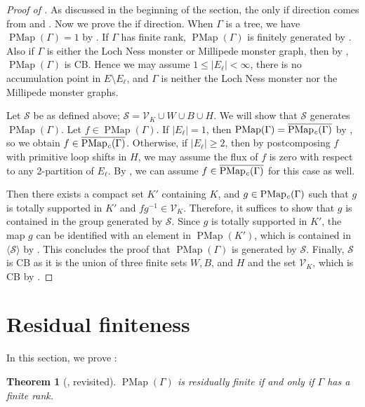 \documentclass[11pt]{amsart}
\theoremstyle{plain}
\newtheorem{THM}{Theorem}[section]
\theoremstyle{definition}
\DeclareMathOperator{\PMap}{PMap}
\DeclareMathOperator{\PMapc}{PMap_{\it c}}
\newcommand{\cV}{\mathcal{V}}
\newcommand{\cS}{\mathcal{S}}
\def\G{{\Gamma}}
\newcommand{\la}{\langle}
\newcommand{\ra}{\rangle}
\newcommand{\<}{\langle}
\renewcommand{\>}{\rangle}
\begin{document}
\begin{proof}[Proof of ]
    As discussed in the beginning of the section, the only if direction comes from  and . Now we prove the if direction.
    When $\G$ is a tree, we have $\PMap(\G)=1$ by . If $\G$ has finite rank,
    $\PMap(\G)$ is finitely generated by . Also if $\G$ is either the Loch Ness monster or Millipede monster graph, then by , $\PMap(\G)$ is CB. Hence we may
    assume $1 \le |E_\ell|<\infty$, there is no accumulation point in
    $E\setminus E_\ell$, and $\G$ is neither the Loch Ness monster nor the Millipede monster graphs.

    Let $\cS$ be as defined above; $\cS = \cV_K \cup W \cup B \cup H$. We will show that $\cS$ generates $\PMap(\G)$. Let $f \in \PMap(\G)$.
    If $|E_\ell|=1$, then $\PMap(\G) = \overline{\PMapc(\G)}$ by , so we obtain $f \in \overline{\PMapc(\G)}$.
    Otherwise, if $|E_\ell| \ge 2$, then by postcomposing $f$ with primitive loop shifts in $H$, we may assume the flux of $f$ is zero with respect to any 2-partition of $E_\ell$. By , we can assume $f \in \overline{\PMapc(\G)}$ for this case as well.
    
    Then there exists a compact set $K'$ containing $K$, and $g \in \PMapc(\G)$ such that $g$ is totally supported in $K'$ and $fg^{-1} \in \cV_K$. Therefore, it suffices to show that $g$ is contained in the group generated by $\cS$. Since $g$ is totally supported in $K'$, the map $g$
    can be identified with an element in $\PMap(K')$, which is contained in
    $\la \cS \ra$ by . This concludes the proof that $\PMap(\G)$ is generated by $\cS$. Finally, $\cS$ is CB as it is the union of three finite sets $W,B$, and $H$ and the set $\cV_{K}$, which is CB by .
\end{proof}

\section{Residual finiteness} \label{sec:RF}
In this section, we prove :
\begin{THM}[, revisited]\label{thm:PMapRF_revisited}
   $\PMap(\G)$ is residually finite if and only if $\G$ has a finite rank.
 \end{THM}
\end{document}
